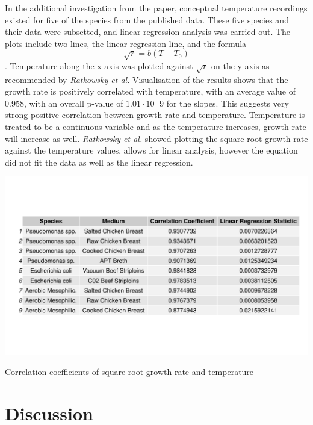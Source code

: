 \documentclass[11pt]{article}
\begin{document}
In the additional investigation from the paper, conceptual temperature recordings existed for five of the species from the published data. These five species and their data were subsetted, and linear regression analysis was carried out. The plots include two lines, the linear regression line, and the formula \begin{equation*}\sqrt{r}=b(T-T_0)\end{equation*}\cite{ratkowsky1982relationship}. Temperature along the x-axis was plotted against $\sqrt{r}$ on the y-axis as recommended by \textit{Ratkowsky et al.} Visualisation of the results shows that the growth rate is positively correlated with temperature, with an average value of 0.958, with an overall p-value of $1.01\cdot10^-9$ for the slopes. This suggests very strong positive correlation between growth rate and temperature. Temperature is treated to be a continuous variable and as the temperature increases, growth rate will increase as well. \textit{Ratkowsky et al.} showed plotting the square root growth rate against the temperature values, allows for linear analysis, however the equation did not fit the data as well as the linear regression.
\begin{table}[h!]
\centering
\includegraphics[scale=0.40]{../Results/Temperature_Growthrate.pdf} \caption{Correlation coefficients of square root growth rate and temperature} \label{tab:Correlation Table}
\end{table}

\section{Discussion}
\end{document}
